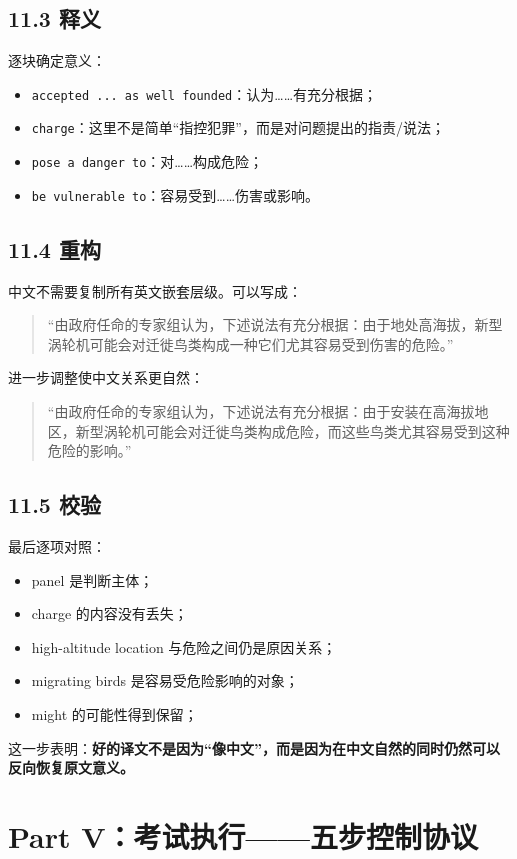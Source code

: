 \documentclass[11pt,a4paper]{ctexart}
\newcommand{\kw}[1]{\textbf{#1}}
\newcommand{\yes}{\textcolor{deepgreen}{\ding{51}}}
\begin{document}
\subsection{11.3 释义}
逐块确定意义：
\begin{itemize}
  \item \texttt{accepted ... as well founded}：认为……有充分根据；
  \item \texttt{charge}：这里不是简单“指控犯罪”，而是对问题提出的指责/说法；
  \item \texttt{pose a danger to}：对……构成危险；
  \item \texttt{be vulnerable to}：容易受到……伤害或影响。
\end{itemize}

\subsection{11.4 重构}
中文不需要复制所有英文嵌套层级。可以写成：
\begin{quote}
“由政府任命的专家组认为，下述说法有充分根据：由于地处高海拔，新型涡轮机可能会对迁徙鸟类构成一种它们尤其容易受到伤害的危险。”
\end{quote}
进一步调整使中文关系更自然：
\begin{quote}
“由政府任命的专家组认为，下述说法有充分根据：由于安装在高海拔地区，新型涡轮机可能会对迁徙鸟类构成危险，而这些鸟类尤其容易受到这种危险的影响。”
\end{quote}

\subsection{11.5 校验}
最后逐项对照：
\begin{itemize}
  \item panel 是判断主体；\yes
  \item charge 的内容没有丢失；\yes
  \item high-altitude location 与危险之间仍是原因关系；\yes
  \item migrating birds 是容易受危险影响的对象；\yes
  \item might 的可能性得到保留；\yes
\end{itemize}

这一步表明：\kw{好的译文不是因为“像中文”，而是因为在中文自然的同时仍然可以反向恢复原文意义。}

\newpage
\section{Part V：考试执行——五步控制协议}
\end{document}
